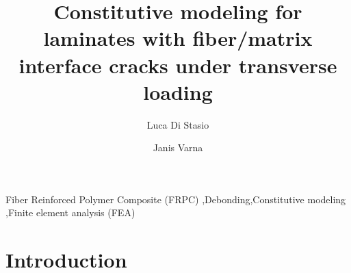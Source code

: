\documentclass[review]{elsarticle}
\begin{document}
\begin{frontmatter}

\title{Constitutive modeling for laminates with fiber/matrix interface cracks under transverse loading}


\author[lulea]{Luca Di Stasio}
\author[lulea]{Janis Varna}


\address[lulea]{Lule\aa\ University of Technology, University Campus, SE-97187 Lule\aa, Sweden}


\begin{abstract}

\end{abstract}

\begin{keyword}
Fiber Reinforced Polymer Composite (FRPC) \sep Debonding\sep Constitutive modeling \sep Finite element analysis (FEA)
\end{keyword}

\end{frontmatter}

\linenumbers

\section{Introduction}
\end{document}
